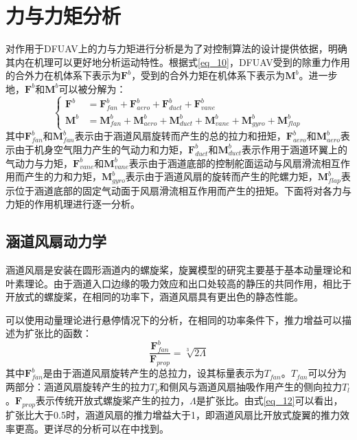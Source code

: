 \section{力与力矩分析}

对作用于DFUAV上的力与力矩进行分析是为了对控制算法的设计提供依据，明确其内在机理可以更好地分析运动特性。根据式\eqref{eq_10}，DFUAV受到的除重力作用的合外力在机体系下表示为$\boldsymbol{F}^b$，受到的合外力矩在机体系下表示为$\boldsymbol{M}^b$。进一步地，$\boldsymbol{F}^b$和$\boldsymbol{M}^b$可以被分解为：
\begin{equation}
    \left\{
    \begin{aligned}
        \boldsymbol{F}^b&=\boldsymbol{F}_{fan}^b+\boldsymbol{F}_{aero}^b+\boldsymbol{F}_{duct}^b+\boldsymbol{F}_{vane}^b \\
        \boldsymbol{M}^b&=\boldsymbol{M}_{fan}^b+\boldsymbol{M}_{aero}^b+\boldsymbol{M}_{duct}^b+\boldsymbol{M}_{vane}^b+\boldsymbol{M}_{gyro}^b+\boldsymbol{M}_{flap}^b
    \end{aligned}
\right.
\label{eq_11}
\end{equation}
其中$\boldsymbol{F}_{fan}^b$和$\boldsymbol{M}_{fan}^b$表示由于涵道风扇旋转而产生的总的拉力和扭矩，$\boldsymbol{F}_{aero}^b$和$\boldsymbol{M}_{aero}^b$表示由于机身空气阻力产生的气动力和力矩，$\boldsymbol{F}_{duct}^b$和$\boldsymbol{M}_{duct}^b$表示作用于涵道环翼上的气动力与力矩，$\boldsymbol{F}_{vane}^b$和$\boldsymbol{M}_{vane}^b$表示由于涵道底部的控制舵面运动与风扇滑流相互作用而产生的力和力矩，$\boldsymbol{M}_{gyro}^b$表示由于涵道风扇的旋转而产生的陀螺力矩，$\boldsymbol{M}_{flap}^b$表示位于涵道底部的固定气动面于风扇滑流相互作用而产生的扭矩。下面将对各力与力矩的作用机理进行逐一分析。

\subsection{涵道风扇动力学}

涵道风扇是安装在圆形涵道内的螺旋桨，旋翼模型的研究主要基于基本动量理论和叶素理论。由于涵道入口边缘的吸力效应和出口处较高的静压的共同作用，相比于开放式的螺旋桨，在相同的功率下，涵道风扇具有更出色的静态性能。

可以使用动量理论进行悬停情况下的分析，在相同的功率条件下，推力增益可以描述为扩张比的函数：
\begin{equation}
    \dfrac{\boldsymbol{F}_{fan}^b}{\boldsymbol{F}_{prop}}={\sqrt[3]{2\Lambda}}
    \label{eq_12}
\end{equation}
其中$\boldsymbol{F}_{fan}^b$是由于涵道风扇旋转产生的总拉力，设其标量表示为$T_{fan}$。$T_{fan}$可以分为两部分：涵道风扇旋转产生的拉力$T_{p}$和侧风与涵道风扇抽吸作用产生的侧向拉力$T_{l}$。$\boldsymbol{F}_{prop}$表示传统开放式螺旋桨产生的拉力，$\Lambda$是扩张比。由式\eqref{eq_12}可以看出，扩张比大于0.5时，涵道风扇的推力增益大于1，即涵道风扇比开放式旋翼的推力效率更高。更详尽的分析可以在\parencite{pereiraHoverWindtunnelTesting2008}中找到。

